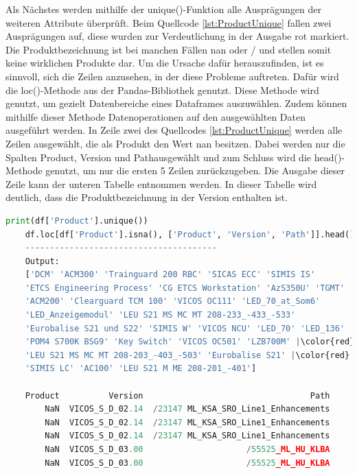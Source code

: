 Als Nächstes werden mithilfe der unique()-Funktion alle Ausprägungen der weiteren Attribute überprüft. Beim Quellcode \ref*{lst:ProductUnique} fallen zwei Ausprägungen
auf, diese wurden zur Verdeutlichung in der Ausgabe rot markiert. Die Produktbezeichnung ist bei manchen Fällen \glqq nan\grqq{} oder \glqq /\grqq{} und stellen somit
keine wirklichen Produkte dar. Um die Ursache dafür herauszufinden, ist es sinnvoll, sich die Zeilen anzusehen, in der diese Probleme auftreten. Dafür wird die
loc()-Methode aus der Pandas-Bibliothek genutzt. Diese Methode wird genutzt, um gezielt Datenbereiche eines Dataframes auszuwählen. Zudem können mithilfe dieser Methode
Datenoperationen auf den ausgewählten Daten ausgeführt werden. In Zeile zwei des Quellcodes \ref*{lst:ProductUnique} werden alle Zeilen ausgewählt, die als Produkt
den Wert \glqq nan\grqq{} besitzen. Dabei werden nur die Spalten \glqq Product\grqq{}, \glqq Version\grqq{} und \glqq Path\grqq ausgewählt und zum Schluss
wird die head()-Methode genutzt, um nur die ersten 5 Zeilen zurückzugeben. Die Ausgabe dieser Zeile kann der unteren Tabelle entnommen werden.
In dieser Tabelle wird deutlich, dass die Produktbezeichnung in der Version enthalten ist. 

\begin{lstlisting}[language = python, caption={Ausprägungen des Attributs Product},captionpos=b, label = lst:ProductUnique, floatplacement=H, escapechar={|}]
    print(df['Product'].unique())
    df.loc[df['Product'].isna(), ['Product', 'Version', 'Path']].head()
    ---------------------------------------
    Output:
    ['DCM' 'ACM300' 'Trainguard 200 RBC' 'SICAS ECC' 'SIMIS IS'
    'ETCS Engineering Process' 'CG ETCS Workstation' 'AzS350U' 'TGMT'
    'ACM200' 'Clearguard TCM 100' 'VICOS OC111' 'LED_70_at_Som6'
    'LED_Anzeigemodul' 'LEU S21 MS MC MT 208-233_-433_-533'
    'Eurobalise S21 und S22' 'SIMIS W' 'VICOS NCU' 'LED_70' 'LED_136'
    'POM4 S700K BSG9' 'Key Switch' 'VICOS OC501' 'LZB700M' |\color{red}nan|
    'LEU S21 MS MC MT 208-203_-403_-503' 'Eurobalise S21' |\color{red}'/'| 'DTS'
    'SIMIS LC' 'AC100' 'LEU S21 M ME 208-201_-401']

    Product          Version                                  Path
        NaN  VICOS_S_D_02.14  /23147 ML_KSA_SRO_Line1_Enhancements
        NaN  VICOS_S_D_02.14  /23147 ML_KSA_SRO_Line1_Enhancements
        NaN  VICOS_S_D_02.14  /23147 ML_KSA_SRO_Line1_Enhancements
        NaN  VICOS_S_D_03.00                     /55525_ML_HU_KLBA
        NaN  VICOS_S_D_03.00                     /55525_ML_HU_KLBA
\end{lstlisting}


